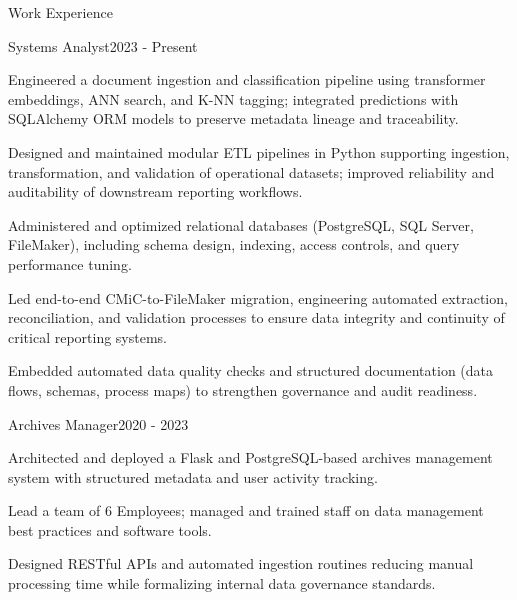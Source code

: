 \documentclass{resume}
\begin{document}
    \begin{rSection}{Work Experience}
                    \begin{rSubsection}
                {Systems Analyst}{2023 - Present}
                                    {}
                                {}
                                    \item Engineered a document ingestion and classification pipeline using transformer embeddings, ANN search, and K-NN tagging; integrated predictions with SQLAlchemy ORM models to preserve metadata lineage and traceability.
                                    \item Designed and maintained modular ETL pipelines in Python supporting ingestion, transformation, and validation of operational datasets; improved reliability and auditability of downstream reporting workflows.
                                    \item Administered and optimized relational databases (PostgreSQL, SQL Server, FileMaker), including schema design, indexing, access controls, and query performance tuning.
                                    \item Led end-to-end CMiC-to-FileMaker migration, engineering automated extraction, reconciliation, and validation processes to ensure data integrity and continuity of critical reporting systems.
                                    \item Embedded automated data quality checks and structured documentation (data flows, schemas, process maps) to strengthen governance and audit readiness.
                            \end{rSubsection}
                    \begin{rSubsection}
                {Archives Manager}{2020 - 2023}
                                    {}
                                {}
                                    \item Architected and deployed a Flask and PostgreSQL-based archives management system with structured metadata and user activity tracking.
                                    \item Lead a team of 6 Employees; managed and trained staff on data management best practices and software tools.
                                    \item Designed RESTful APIs and automated ingestion routines reducing manual processing time while formalizing internal data governance standards.

\end{rSubsection}
\end{rSection}
\end{document}
